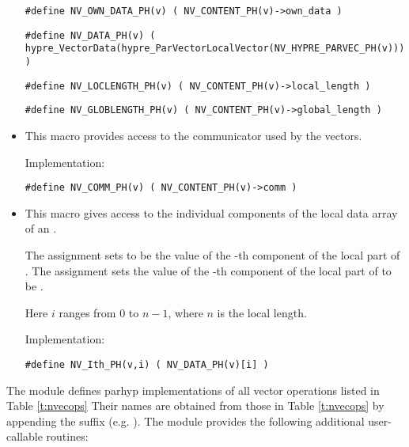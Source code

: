 \begin{itemize}
  \verb|#define NV_OWN_DATA_PH(v) ( NV_CONTENT_PH(v)->own_data )|

  \verb|#define NV_DATA_PH(v) ( hypre_VectorData(hypre_ParVectorLocalVector(NV_HYPRE_PARVEC_PH(v))) )|

  \verb|#define NV_LOCLENGTH_PH(v) ( NV_CONTENT_PH(v)->local_length )|

  \verb|#define NV_GLOBLENGTH_PH(v) ( NV_CONTENT_PH(v)->global_length )|
  
\item {}

  This macro provides access to the {\mpi} communicator used by the {\nvecph}
  vectors.

  Implementation:

  \verb|#define NV_COMM_PH(v) ( NV_CONTENT_PH(v)->comm )|

\item {}

  This macro gives access to the individual components of the local data
  array of an .

  The assignment  sets  to be the value of 
  the -th component of the local part of . 
  The assignment    
  sets the value of the -th component of the local part of  
  to be .        
  
  Here $i$ ranges from $0$ to $n-1$, where $n$ is the local length.
      
  Implementation:

  \verb|#define NV_Ith_PH(v,i) ( NV_DATA_PH(v)[i] )|

\end{itemize}
The {\nvecph} module defines parhyp implementations of all vector operations listed 
in Table \ref{t:nvecops}  Their names are obtained from those in Table \ref{t:nvecops}
by appending the suffix  (e.g. ).
The module {\nvecph} provides the following additional user-callable routines:
